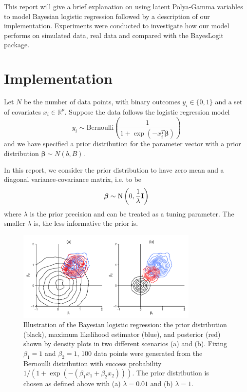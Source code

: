 \documentclass[a4paper]{article}\usepackage[]{graphicx}\usepackage[]{color}
\newcommand{\boldbeta}{\boldsymbol{\beta}}
\newcommand{\Be}{\text{Bernoulli}}
\begin{document}
This report will give a brief explanation on using latent Polya-Gamma variables to model Bayesian logistic regression followed by a description of our implementation. Experiments were conducted to investigate how our model performs on simulated data, real data and compared with the BayesLogit package.

\section{Implementation}

Let $N$ be the number of data points, with binary outcomes $y_i \in \{0, 1\}$ and a set of covariates $x_i \in \mathbb{R}^p$. Suppose the data follows the logistic regression model
\[
y_i \sim \Be\left( \frac{1}{1 + \exp(-x_i^T \boldbeta)} \right)
\]
and we have specified a prior distribution for the parameter vector with a prior distribution $\boldbeta \sim N(b, B)$.

In this report, we consider the prior distribution to have zero mean and a diagonal variance-covariance matrix, i.e. to be
\begin{equation}
\boldbeta \sim \textup{N}\left(0,\dfrac{1}{\lambda} \mathbf{I} \right )
\end{equation}
where $\lambda$ is the prior precision and can be treated as a tuning parameter. The smaller $\lambda$ is, the less informative the prior is.

\begin{figure}[ht]
\centering
\includegraphics[width=0.8\textwidth]{prior_and_posterior}
\caption{Illustration of the Bayesian logistic regression: the prior distribution (black), maximum likelihood estimator (blue), and posterior (red) shown by density plots in two different scenarios (a) and (b). Fixing $\beta_1=1$ and $\beta_2=1$, 100 data points were generated from the Bernoulli distribution with success probability $1/(1+\exp(-(\beta_1 x_1 + \beta_2 x_2)))$. The prior distribution is chosen as defined above with (a) $\lambda=0.01$ and (b) $\lambda=1$.}
\label{fig:prior_and_posterior}
\end{figure}
\end{document}
